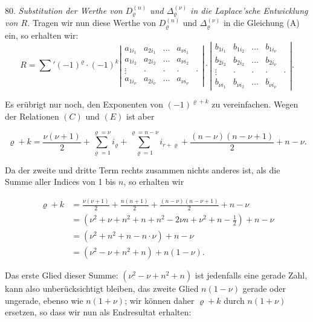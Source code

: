 \documentclass[11pt]{article}
\providecommand{\weberpage}[1]{}
\begin{document}
80. \textit{Substitution der Werthe von $D_\varrho^{(n)}$ und $\varDelta_\varrho^{(\nu)}$ in
die Laplace'sche Entwicklung von $R$.} Tragen wir nun diese Werthe von
$D_\varrho^{(n)}$ und $\varDelta_\varrho^{(\nu)}$ in die Gleichung (A) ein, so
erhalten wir:
\[
R=\sum{}'(-1)^\varrho\cdot(-1)^k
\left|\begin{array}{ccccc}
a_{1i_1} & a_{2i_1} & \ldots & a_{\nu i_1}\\
a_{1i_2} & a_{2i_2} & \ldots & a_{\nu i_2}\\
\vdots & \cdot & \cdot & \cdot & \cdot\\
a_{1i_\nu} & a_{2i_\nu} & \ldots & a_{\nu i_\nu}
\end{array}\right|
\cdot
\left|\begin{array}{ccccc}
b_{1i_1} & b_{1i_2} & \ldots & b_{1i_\nu}\\
b_{2i_2} & b_{2i_2} & \ldots & b_{2i_\nu}\\
\vdots & \cdot & \cdot & \cdot & \cdot\\
b_{\nu i_1} & b_{\nu i_2} & \ldots & b_{\nu i_\nu}
\end{array}\right|.
\]


\weberpage{85}

Es erübrigt nur noch, den Exponenten von $(-1)^{\varrho+k}$ zu vereinfachen. Wegen der Relationen $(C)$ und $(E)$ ist aber

\[
\varrho+k=\frac{\nu(\nu+1)}{2}+\sum_{\varrho=1}^{\varrho=\nu}i_\varrho+\sum_{\varrho=1}^{\varrho=n-\nu}i_{r+\varrho}+\frac{(n-\nu)(n-\nu+1)}{2}+n-\nu.
\]

Da der zweite und dritte Term rechts zusammen nichts anderes ist, als die Summe aller Indices von 1 bis $n$, so erhalten wir

\[
\begin{aligned}
\varrho+k&=\frac{\nu(\nu+1)}{2}+\frac{n(n+1)}{2}+\frac{(n-\nu)(n-\nu+1)}{2}+n-\nu\\
&=(\nu^2+\nu+n^2+n+n^2-2\nu n+\nu^2+n-\tfrac{1}{2})+n-\nu\\
&=(\nu^2+n^2+n-n\cdot\nu)+n-\nu\\
&=(\nu^2-\nu+n^2+n)+n(1-\nu).
\end{aligned}
\]

Das erste Glied dieser Summe: $(\nu^2-\nu+n^2+n)$ ist jedenfalls eine gerade Zahl, kann also unberücksichtigt bleiben, das zweite Glied $n(1-\nu)$ gerade oder ungerade, ebenso wie $n(1+\nu)$; wir können daher $\varrho+k$ durch $n(1+\nu)$ ersetzen, so dass wir nun als Endresultat erhalten:
\end{document}
